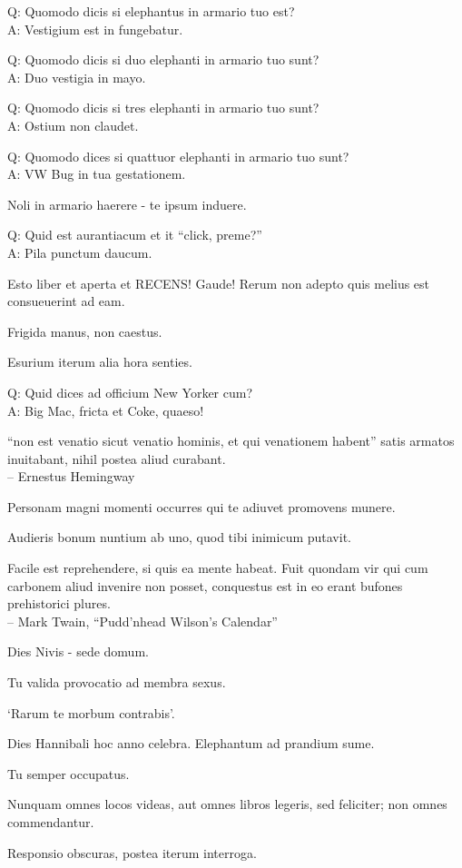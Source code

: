 \documentclass[titlepage,12pt]{memoir}
\begin{document}
Q: Quomodo dicis si elephantus in armario tuo est?\\
A: Vestigium est in fungebatur.

Q: Quomodo dicis si duo elephanti in armario tuo sunt?\\
A: Duo vestigia in mayo.

Q: Quomodo dicis si tres elephanti in armario tuo sunt?\\
A: Ostium non claudet.

Q: Quomodo dices si quattuor elephanti in armario tuo sunt?\\
A: VW Bug in tua gestationem.

Noli in armario haerere - te ipsum induere.

Q: Quid est aurantiacum et it “click, preme?”\\
A: Pila punctum daucum.

Esto liber et aperta et RECENS! Gaude! Rerum non adepto quis melius est
consueuerint ad eam.

Frigida manus, non caestus.

Esurium iterum alia hora senties.

Q: Quid dices ad officium New Yorker cum?\\
A: Big Mac, fricta et Coke, quaeso!

“non est venatio sicut venatio hominis, et qui venationem habent”
satis armatos inuitabant, nihil postea aliud curabant.
\\-- Ernestus Hemingway

Personam magni momenti occurres qui te adiuvet promovens munere.

Audieris bonum nuntium ab uno, quod tibi inimicum putavit.

Facile est reprehendere, si quis ea mente habeat. Fuit quondam vir
qui cum carbonem aliud invenire non posset, conquestus est
in eo erant bufones prehistorici plures.
\\-- Mark Twain, “Pudd’nhead Wilson’s Calendar”

Dies Nivis - sede domum.

Tu valida provocatio ad membra sexus.

‘Rarum te morbum contrabis’.

Dies Hannibali hoc anno celebra. Elephantum ad prandium sume.

Tu semper occupatus.

Nunquam omnes locos videas, aut omnes libros legeris, sed feliciter;
non omnes commendantur.

Responsio obscuras, postea iterum interroga.
\end{document}
